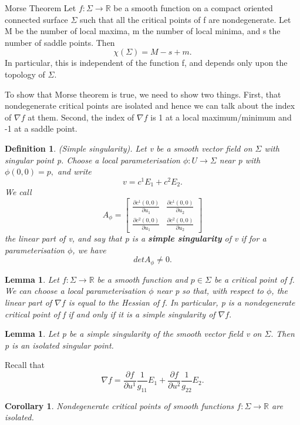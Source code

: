 \documentclass[twoside]{article}
\newtheorem{lemma}[theorem]{Lemma}
\newtheorem{corollary}[theorem]{Corollary}
\newtheorem{definition}[theorem]{Definition}
\begin{document}
\begin{theorem_exam}{Morse Theorem}{} Let $f: \Sigma \rightarrow \mathbb{R}$ be a smooth function on a compact oriented connected surface $\Sigma$ such that all the critical points of f are nondegenerate. Let M be the number of local maxima, m the number of local minima, and s the number of saddle points. Then 
$$
\chi(\Sigma) = M - s + m.
$$
In particular, this is independent of the function f, and depends only upon the topology of $\Sigma.$
\end{theorem_exam}

To show that Morse theorem is true, we need to show two things. First, that nondegenerate critical points are isolated and hence we can talk about the index of $\nabla f$ at them. Second, the index of $\nabla f$ is 1 at a local maximum/minimum and -1 at a saddle point.

\begin{definition}(Simple singularity). Let v be a smooth vector field on $\Sigma$ with singular point p. Choose a local parameterisation $\phi: U \rightarrow \Sigma$ near p with $\phi(0,0) = p,$ and write 
$$
v = c^1E_1 + c^2E_2.
$$
We call 
$$
A_{\phi} = \begin{bmatrix}
\frac{\partial c^1(0,0)}{\partial u_1} & \frac{\partial c^1(0,0)}{\partial u_2}\\
\frac{\partial c^2(0,0)}{\partial u_1} & \frac{\partial c^2(0,0)}{\partial u_2}
\end{bmatrix}
$$
the linear part of v, and say that p is a \textbf{simple singularity} of v if for a parameterisation $\phi$, we have 
$$
det A_{\phi} \neq 0.
$$
\end{definition}

\begin{lemma}Let $f: \Sigma \rightarrow \mathbb{R}$ be a smooth function and $p \in \Sigma$ be a critical point of f. We can choose a local parameterisation $\phi$ near p so that, with respect to $\phi$, the linear part of $\nabla f$ is equal to the Hessian of f. In particular, p is a nondegenerate critical point of f if and only if it is a simple singularity of $\nabla f.$
\end{lemma}

\begin{lemma}Let p be a simple singularity of the smooth vector field v on $\Sigma.$ Then p is an isolated singular point.
\end{lemma}

Recall that 
$$
\nabla f = \frac{\partial f}{\partial u^1}\frac{1}{g_11}E_1 + \frac{\partial f}{\partial u^2}\frac{1}{g_22}E_2.
$$
\begin{corollary}Nondegenerate critical points of smooth functions $f: \Sigma \rightarrow \mathbb{R}$ are isolated.
\end{corollary}
\end{document}

